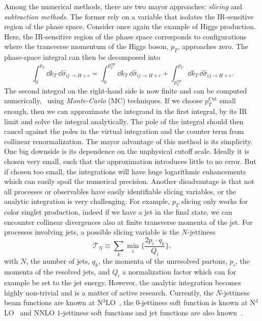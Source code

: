 Among the numerical methods, there are two mayor approaches: \textit{slicing} and \textit{subtraction methods}. The former rely on a variable that isolates the \acs{IR}-sensitive region of the phase space. Consider once again the example of Higgs production. Here, the IR-sensitive region of the phase space corresponds to configurations where the transverse momentum of the Higgs boson, $p_T$, approaches zero. The phase-space integral can then be decomposed into
\begin{equation}
\int_0^{p_T} \dd k_T \, \dd \hat{\sigma}_{ij \rightarrow H + c} = \int_0^{p_T^\text{cut}} \dd k_T \, \dd \hat{\sigma}_{ij \rightarrow H + c} + \int_{p_T^\text{cut}}^{p_T} \dd k_T \, \dd \hat{\sigma}_{ij \rightarrow H + c}.
\end{equation}
The second integral on the right-hand side is now finite and can be computed numerically, \eg\ using \textit{Monte-Carlo} (\acs{MC}) techniques. If we choose $p_T^{\text{Cut}}$ small enough, then we can approximate the integrand in the first integral, by its \acs{IR} limit and solve the integral analytically. The pole of the integral should then cancel against the poles in the virtual integration and the counter term from collinear renormalization. The mayor advantage of this method is its simplicity. One big  downside is its dependence on the unphysical cutoff scale. Ideally it is chosen very small, such that the approximation introduces little to no error. But if chosen too small, the integrations will have huge logarithmic enhancements which can easily spoil the numerical precision. Another disadvantage is that not all processes or observables have easily identifiable slicing variables, or the analytic integration is very challenging. For example, $p_T$ slicing only works for color singlet production, indeed if we have a jet in the final state, we can encounter collinear divergences also at finite transverse momenta of the jet. For processes involving jets, a possible slicing variable is the $N$-jettiness
\begin{equation}
\mathcal{T}_N \equiv \sum_k \min_i\! \bigg \lbrace \frac{2 p_i \cdot q_k}{Q_i} \bigg \rbrace,
\end{equation}
with $N$, the number of jets, $q_k$, the momenta of the unresolved partons, $p_i$, the momenta of the resolved jets, and $Q_i$ a normalization factor which can for example be set to the jet energy. However, the analytic integration becomes highly non-trivial and is a matter of active research. Currently, the $N$-jettiness beam functions are known at N${}^3$LO~\cite{Ebert:2020unb}, the $0$-jettiness soft function is known at N${}^3$LO~\cite{Baranowski:2024vxg, Baranowski:2024ysi} and \acs{NNLO} $1$-jettiness soft functions and jet functions are also known~\cite{Campbell:2017hsw, Becher:2010pd, Becher:2006qw, Boughezal:2015eha}.

